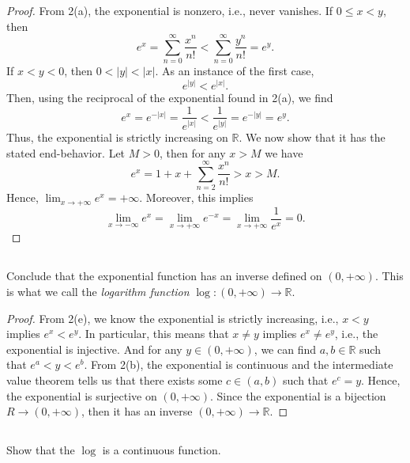 \documentclass[12pt]{article}
\newenvironment{problem}
    {\begin{lrbox}{\mybox}\begin{minipage}{0.98\textwidth}}
    {\end{minipage}\end{lrbox}\begin{center}\framebox[\textwidth]{\usebox{\mybox}}\end{center}}
\theoremstyle{definition}
\newcommand{\ds}{\displaystyle}
\newcommand{\R}{\mathbb{R}}
\begin{document}
\begin{proof}
    From 2(a), the exponential is nonzero, i.e., never vanishes. If $0 \leq x < y$, then
    \[
        e^x = \sum_{n=0}^\infty \frac{x^n}{n!} < \sum_{n=0}^\infty \frac{y^n}{n!} = e^y.
    \]
    If $x < y < 0$, then $0 < |y| < |x|$. As an instance of the first case,
    \[
        e^{|y|} < e^{|x|}.
    \]
    Then, using the reciprocal of the exponential found in 2(a), we find
    \[
        e^x = e^{-|x|} = \frac{1}{e^{|x|}} < \frac{1}{e^{|y|}} = e^{-|y|} = e^y.
    \]
    Thus, the exponential is strictly increasing on $\R$. We now show that it has the stated end-behavior. Let $M > 0$, then for any $x > M$ we have
    \[
        e^x = 1 + x + \sum_{n=2}^\infty \frac{x^n}{n!} > x > M.
    \]
    Hence, $\ds\lim_{x\to +\infty} e^x = +\infty$. Moreover, this implies
    \[
        \lim_{x\to -\infty} e^x = \lim_{x\to +\infty} e^{-x} = \lim_{x\to +\infty} \frac{1}{e^x} = 0.
    \]
    
\end{proof}

\subsection{}
\begin{problem}
    Conclude that the exponential function has an inverse defined on $(0,+\infty)$. This is what we call the \emph{logarithm function} $\log:(0,+\infty)\to \R$.
\end{problem}

\begin{proof}
    From 2(e), we know the exponential is strictly increasing, i.e., $x < y$ implies $e^x < e^y$. In particular, this means that $x \ne y$ implies $e^x \ne e^y$, i.e., the exponential is injective. And for any $y \in (0, +\infty)$, we can find $a, b \in \R$ such that $e^a < y < e^b$. From 2(b), the exponential is continuous and the intermediate value theorem tells us that there exists some $c \in (a, b)$ such that $e^c = y$. Hence, the exponential is surjective on $(0, +\infty)$. Since the exponential is a bijection $R \to (0, +\infty)$, then it has an inverse $(0, +\infty) \to \R$.
    
\end{proof} 

\subsection{}
\begin{problem}
    Show that the $\log$ is a continuous function.
\end{problem}
\end{document}

